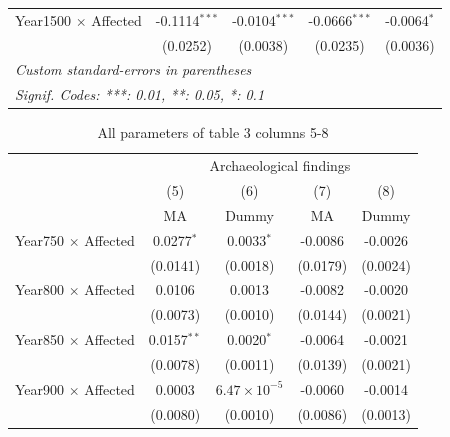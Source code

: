 \begin{table}[H]
\begin{tabular}{lcccc}
   Year1500 $\times$ Affected                       & -0.1114$^{***}$ & -0.0104$^{***}$ & -0.0666$^{***}$       & -0.0064$^{*}$\\   
                                                    & (0.0252)        & (0.0038)        & (0.0235)              & (0.0036)\\   
   \midrule \midrule
   \multicolumn{5}{l}{\emph{Custom standard-errors in parentheses}}\\
   \multicolumn{5}{l}{\emph{Signif. Codes: ***: 0.01, **: 0.05, *: 0.1}}\\
\end{tabular}
\end{table}


\begin{table}
\centering
\footnotesize
\caption{\label{tab:A_arch2} All parameters of table 3 columns 5-8}
\begin{tabular}{lcccc}
   \tabularnewline \midrule \midrule
                                                    & \multicolumn{4}{c}{Archaeological findings}\\
                                                    & (5)             & (6)             & (7)                   & (8)\\  
                                                    & MA              & Dummy           & MA                    & Dummy\\
   \midrule
   Year750 $\times$ Affected   & 0.0277$^{*}$           & 0.0033$^{*}$           & -0.0086        & -0.0026\\   
                               & (0.0141)               & (0.0018)               & (0.0179)       & (0.0024)\\   
   Year800 $\times$ Affected   & 0.0106                 & 0.0013                 & -0.0082        & -0.0020\\   
                               & (0.0073)               & (0.0010)               & (0.0144)       & (0.0021)\\   
   Year850 $\times$ Affected   & 0.0157$^{**}$          & 0.0020$^{*}$           & -0.0064        & -0.0021\\   
                               & (0.0078)               & (0.0011)               & (0.0139)       & (0.0021)\\   
   Year900 $\times$ Affected   & 0.0003                 & $6.47\times 10^{-5}$   & -0.0060        & -0.0014\\   
                               & (0.0080)               & (0.0010)               & (0.0086)       & (0.0013)\\   

\end{tabular}
\end{table}
